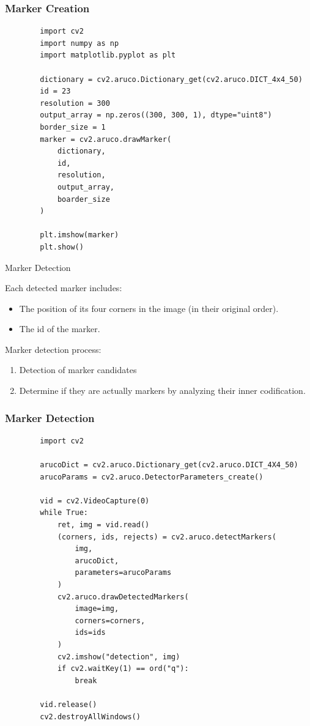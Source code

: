 \documentclass[12pt,letterpaper]{beamer}
\begin{document}
\begin{frame}[fragile]
    \frametitle{Marker Creation}

    {\scriptsize
    \begin{verbatim}
        import cv2
        import numpy as np
        import matplotlib.pyplot as plt

        dictionary = cv2.aruco.Dictionary_get(cv2.aruco.DICT_4x4_50)
        id = 23
        resolution = 300
        output_array = np.zeros((300, 300, 1), dtype="uint8")
        border_size = 1
        marker = cv2.aruco.drawMarker(
            dictionary, 
            id, 
            resolution, 
            output_array, 
            boarder_size
        )
        
        plt.imshow(marker)
        plt.show()
    \end{verbatim}
}
\end{frame}

\begin{frame}{Marker Detection}

    Each detected marker includes:
    {\scriptsize
        \begin{itemize}
            \item The position of its four corners in the image (in their original order).
            \item The id of the marker.
        \end{itemize}
    }
    Marker detection process:
    {\scriptsize
        \begin{enumerate}
            \item Detection of marker candidates
            \item Determine if they are actually markers by analyzing their inner codification.
        \end{enumerate}
    }
\end{frame}

\begin{frame}[fragile]
    \frametitle{Marker Detection}
    \scriptsize
    \begin{verbatim}
        import cv2

        arucoDict = cv2.aruco.Dictionary_get(cv2.aruco.DICT_4X4_50)
        arucoParams = cv2.aruco.DetectorParameters_create()

        vid = cv2.VideoCapture(0)
        while True:
            ret, img = vid.read()
            (corners, ids, rejects) = cv2.aruco.detectMarkers(
                img,
                arucoDict,
                parameters=arucoParams
            )
            cv2.aruco.drawDetectedMarkers(
                image=img,
                corners=corners,
                ids=ids
            )
            cv2.imshow("detection", img)
            if cv2.waitKey(1) == ord("q"):
                break

        vid.release()
        cv2.destroyAllWindows()
    \end{verbatim}
\end{frame}
\end{document}
